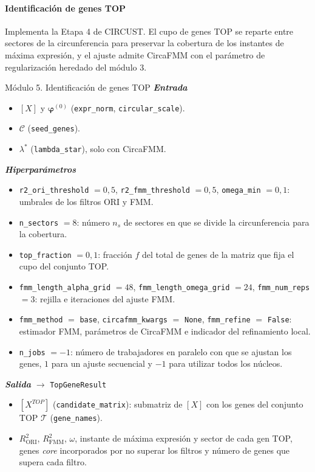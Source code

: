 \documentclass[12pt, a4paper]{report}
\newcommand{\dato}[2]{{\boldmath\textcolor{#1}{#2}}}
\begin{document}
\paragraph{Identificación de genes TOP}
Implementa la Etapa 4 de CIRCUST. El cupo de genes TOP se reparte entre sectores de la circunferencia para preservar la cobertura de los instantes de máxima expresión, y el ajuste admite CircaFMM con el parámetro de regularización heredado del módulo 3.

\begin{panel}{Módulo 5. Identificación de genes TOP}
\textit{\textbf{Entrada}}
\begin{itemize}[nosep,leftmargin=1.5em]
\item \dato{dX}{\([X]\) y \(\boldsymbol{\varphi}^{(0)}\) (\texttt{expr\_norm}, \texttt{circular\_scale})}.
\item \dato{dC}{\(\mathcal{C}\) (\texttt{seed\_genes})}.
\item \dato{dL}{\(\lambda^{*}\) (\texttt{lambda\_star})}, solo con CircaFMM.
\end{itemize}

\textit{\textbf{Hiperparámetros}}
\begin{itemize}[nosep,leftmargin=1.5em]
\item \texttt{r2\_ori\_threshold} \(=0{,}5\), \texttt{r2\_fmm\_threshold} \(=0{,}5\), \texttt{omega\_min} \(=0{,}1\): umbrales de los filtros ORI y FMM.
\item \texttt{n\_sectors} \(=8\): número \(n_s\) de sectores en que se divide la circunferencia para la cobertura.
\item \texttt{top\_fraction} \(=0{,}1\): fracción \(f\) del total de genes de la matriz que fija el cupo del conjunto TOP.
\item \texttt{fmm\_length\_alpha\_grid} \(=48\), \texttt{fmm\_length\_omega\_grid} \(=24\), \texttt{fmm\_num\_reps} \(=3\): rejilla e iteraciones del ajuste FMM.
\item \texttt{fmm\_method} \(=\) \texttt{base}, \texttt{circafmm\_kwargs} \(=\) \texttt{None}, \texttt{fmm\_refine} \(=\) \texttt{False}: estimador FMM, parámetros de CircaFMM e indicador del refinamiento local.
\item \texttt{n\_jobs} \(=-1\): número de trabajadores en paralelo con que se ajustan los genes, \(1\) para un ajuste secuencial y \(-1\) para utilizar todos los núcleos.
\end{itemize}

\textit{\textbf{Salida}} \(\rightarrow\) \texttt{TopGeneResult}
\begin{itemize}[nosep,leftmargin=1.5em]
\item \dato{dT}{\([X^{TOP}]\) (\texttt{candidate\_matrix})}: submatriz de \([X]\) con los genes del conjunto TOP \(\mathcal{T}\) (\texttt{gene\_names}).
\item \(R^2_{\mathrm{ORI}}\), \(R^2_{\mathrm{FMM}}\), \(\omega\), instante de máxima expresión y sector de cada gen TOP, genes \textit{core} incorporados por no superar los filtros y número de genes que supera cada filtro.
\end{itemize}
\end{panel}
\end{document}
